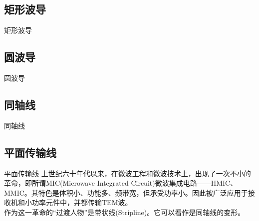 \subsection{矩形波导}
\begin{frame}{矩形波导}

\end{frame}

\subsection{圆波导}
\begin{frame}{圆波导}

\end{frame}

\subsection{同轴线}
\begin{frame}{同轴线}

\end{frame}

\subsection{平面传输线}
\begin{frame}{平面传输线}
    上世纪六十年代以来，在微波工程和微波技术上，出现了一次不小的革命，即所谓MIC(Microwave Integrated Circuit)微波集成电路——HMIC、MMIC。其特色是体积小、功能多、频带宽，但承受功率小。因此被广泛应用于接收机和小功率元件中，并都传输TEM波。\\
    作为这一革命的“过渡人物”是带状线(Stripline)。它可以看作是同轴线的变形。
\end{frame}






